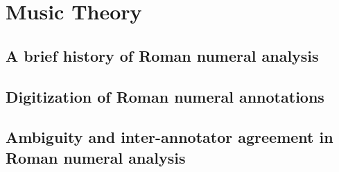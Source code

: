 \section{Music Theory}
\subsection{A brief history of Roman numeral analysis}




\subsection{Digitization of Roman numeral annotations}
\subsection{Ambiguity and inter-annotator agreement in Roman numeral analysis}
